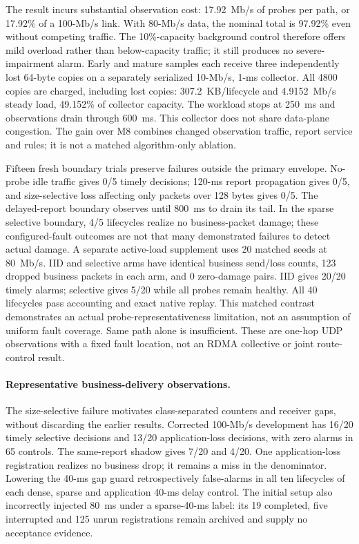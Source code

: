 \documentclass[sigconf]{acmart}
\begin{document}
The result incurs substantial observation cost: 17.92~Mb/s of
probes per path, or 17.92\% of a 100-Mb/s link. With 80-Mb/s data,
the nominal total is 97.92\% even without competing traffic. The
10\%-capacity background control therefore offers mild overload rather
than below-capacity traffic; it still produces no severe-impairment alarm.
Early and mature samples each receive three independently lost 64-byte
copies on a separately serialized 10-Mb/s, 1-ms collector. All 4800
copies are charged, including lost copies: 307.2~KB/lifecycle and
4.9152~Mb/s steady load, 49.152\% of collector capacity. The workload
stops at 250~ms and observations drain through 600~ms. This collector
does not share data-plane congestion. The gain over M8 combines changed
observation traffic, report service and rules; it is not a matched
algorithm-only ablation.

Fifteen fresh boundary trials preserve failures outside the primary
envelope. No-probe idle traffic gives
0/5 timely decisions;
120-ms report propagation gives
0/5, and size-selective loss
affecting only packets over 128 bytes gives
0/5.
The delayed-report boundary observes until 800~ms to drain its tail.
In the sparse selective boundary, 4/5 lifecycles realize no
business-packet damage; these configured-fault outcomes are not that many
demonstrated failures to detect actual damage. A separate active-load
supplement uses 20 matched seeds at 80~Mb/s. IID and selective arms have
identical business send/loss counts, 123 dropped
business packets in each arm, and 0
zero-damage pairs. IID gives 20/20 timely alarms;
selective gives 5/20 while all probes remain
healthy. All 40 lifecycles pass accounting and exact native replay. This
matched contrast demonstrates an actual probe-representativeness limitation,
not an assumption of uniform fault coverage. Same path alone is insufficient.
These are one-hop UDP observations with a fixed
fault location, not an RDMA collective or joint route-control result.

\paragraph{Representative business-delivery observations.}
The size-selective failure motivates class-separated counters and receiver
gaps, without discarding the earlier results. Corrected 100-Mb/s development
has 16/20 timely selective decisions and 13/20 application-loss decisions,
with zero alarms in 65 controls. The same-report shadow gives 7/20 and
4/20. One application-loss registration realizes no business drop; it
remains a miss in the denominator. Lowering the 40-ms gap guard retrospectively
false-alarms in all ten lifecycles of each dense, sparse and application
40-ms delay control. The initial setup also incorrectly injected 80~ms
under a sparse-40-ms label: its 19 completed, five interrupted and 125 unrun
registrations remain archived and supply no acceptance evidence.
\end{document}
